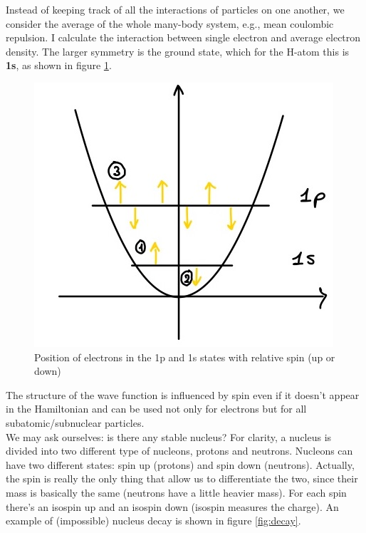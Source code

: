 	Instead of keeping track of all the interactions of particles on one another, we consider the average of the whole many-body system, e.g., mean coulombic repulsion.
I calculate the interaction between single electron and average electron density.
The larger symmetry is the ground state, which for the H-atom this is \textbf{1s}, as shown in figure \ref{fig:spin1}.

	\begin{figure}[htbp!]
 \centering
 \includegraphics[scale=0.20]{img_6}
 \caption{Position of electrons in the 1p and 1s states with relative spin (up or down)}
 \label{fig:spin1}
	\end{figure}

	The structure of the wave function is influenced by spin even if it doesn't appear in the Hamiltonian and can be used not only for electrons but for all subatomic/subnuclear particles.\\
	We may ask ourselves: is there any stable nucleus? For clarity, a nucleus is divided into two different type of nucleons, protons and neutrons.
Nucleons can have two different states: spin up (protons) and spin down (neutrons).
Actually, the spin is really the only thing that allow us to differentiate the two, since their mass is basically the same (neutrons have a little heavier mass).
For each spin there's an isospin up and an isospin down (isospin measures the charge).
An example of (impossible) nucleus decay is shown in figure \ref{fig:decay}.

